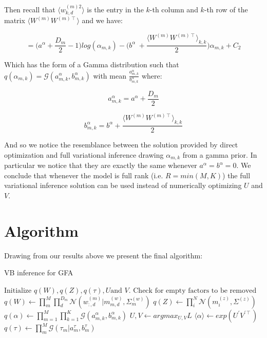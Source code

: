 \documentclass{article}
\begin{document}
Then recall that $\langle w_{k,d}^{(m)2}\rangle$ is the entry in the $k$-th column and $k$-th row of the matrix $\langle W^{(m)}W^{(m)\intercal}\rangle$ and we have:

$$= \bigg(a^\alpha+\frac{D_m}{2}-1 \bigg)log(\alpha_{m,k}) - \bigg(b^\alpha\ + \frac{\langle W^{(m)}W^{(m)\intercal}\rangle_{k,k}}{2} \bigg) \alpha_{m,k} + C_2$$

Which has the form of a Gamma distribution such that $q(\alpha_{m,k}) = \mathcal{G}(a_{m,k}^\alpha, b_{m,k}^\alpha)$ with mean $\frac{a_{m,k}^\alpha}{b_{m,k}^\alpha}$ where:

$$a_{m,k}^\alpha = a^\alpha+\frac{D_m}{2}$$

$$b_{m,k}^\alpha = b^\alpha + \frac{\langle W^{(m)}W^{(m)\intercal}\rangle_{k,k}}{2}$$

And so we notice the resemblance between the solution provided by direct optimization and full variational inference drawing $\alpha_{m,k}$ from a gamma prior. In particular we notice that they are exactly the same whenever $a^\alpha = b^\alpha = 0$. We conclude that whenever the model is full rank (i.e. $R=min(M,K)$) the full variational inference solution can be used instead of numerically optimizing $U$ and $V$.

\section*{Algorithm}

Drawing from our results above we present the final algorithm:

\makeatletter
\def\BState{\State\hskip-\ALG@thistlm}
\makeatother

\begin{algorithm}[H]
\caption{VB inference for GFA}\label{euclid}
\begin{algorithmic}[1]
\State $\text{Initialize } q(W), q(Z), q(\tau), U \text{and } V.$
\State $\text{Check for empty factors to be removed}$
\State $q(W) \gets \prod_m^M{\prod_d^{D_m}{\mathcal{N}(w_{:,d}^{(m)}|m_{m,d}^{(w)}, \Sigma_m^{(w)})}}$
\State $q(Z) \gets \prod_i^N{\mathcal{N}(m_i^{(z)},\Sigma^{(z)})}$
\State $q(\alpha) \gets \prod_{m=1}^M{\prod_{k=1}^K{\mathcal{G}(a_{m,k}^\alpha, b_{m,k}^\alpha)}}$
\Else{}
\State $U, V \gets argmax_{U,V} L$
\State $\langle \alpha \rangle \gets exp(U^\prime V^{\prime \intercal})$
\EndIf
\State $q(\tau) \gets \prod_m^M{\mathcal{G}(\tau_m|a_m^\tau,b_m^\tau)}$
\EndWhile
\end{algorithmic}
\end{algorithm}
\end{document}
